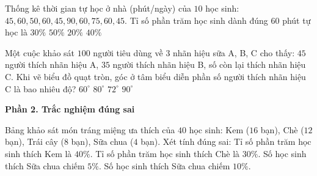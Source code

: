\begin{ex} %
Thống kê thời gian tự học ở nhà (phút/ngày) của $10$ học sinh: $45, 60, 50, 60, 45, 90, 60, 75, 60, 45$. Tỉ số phần trăm học sinh dành đúng $60$ phút tự học là
\choice
{$30\%$}
{$50\%$}
{$20\%$}
{\True $40\%$}
\end{ex}

\begin{ex} %
Một cuộc khảo sát $100$ người tiêu dùng về $3$ nhãn hiệu sữa A, B, C cho thấy: $45$ người thích nhãn hiệu A, $35$ người thích nhãn hiệu B, số còn lại thích nhãn hiệu C. Khi vẽ biểu đồ quạt tròn, góc ở tâm biểu diễn phần số người thích nhãn hiệu C là bao nhiêu độ?
\choice
{$60^\circ$}
{$80^\circ$}
{\True $72^\circ$}
{$90^\circ$}
\end{ex}

\textbf{Phần 2. Trắc nghiệm đúng sai}

\begin{ex} %
Bảng khảo sát món tráng miệng ưa thích của $40$ học sinh: Kem ($16$ bạn), Chè ($12$ bạn), Trái cây ($8$ bạn), Sữa chua ($4$ bạn). Xét tính đúng sai:
\choiceTF
{\True Tỉ số phần trăm học sinh thích Kem là $40\%$.}
{\True Tỉ số phần trăm học sinh thích Chè là $30\%$.}
{Số học sinh thích Sữa chua chiếm $5\%$.}
{\True Số học sinh thích Sữa chua chiếm $10\%$.}
\end{ex}

